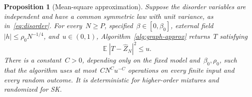 \documentclass[letterpaper,11pt,reqno]{amsart}
\renewcommand{\leq}{\leqslant}
\renewcommand{\geq}{\geqslant}
\DeclareMathOperator{\E}{\mathds{E}}
\newtheorem{proposition}[theorem]{Proposition}
\begin{document}
\begin{proposition}[Mean-square approximation]\label{prop:mean-square}
Suppose the disorder variables are independent and have a common symmetric law with unit variance, as in~\eqref{eq:disorder}. For every~$N\geq P$, specified~$\beta\in[0,\beta_0]$, external field~$|h|\leq\rho_0N^{-1/4}$, and~$u\in(0,1)$, Algorithm~\ref{alg:graph-approx} returns~$T$ satisfying
\begin{equation}\label{eq:mean-square-guarantee}
\E|T-\widehat Z_N|^2\leq u.
\end{equation}
There is a constant~$C>0$, depending only on the fixed model and~$\beta_0,\rho_0$, such that the algorithm uses at most~$CN^Cu^{-C}$ operations on every finite input and every random outcome. It is deterministic for higher-order mixtures and randomized for SK.
\end{proposition}
\end{document}

